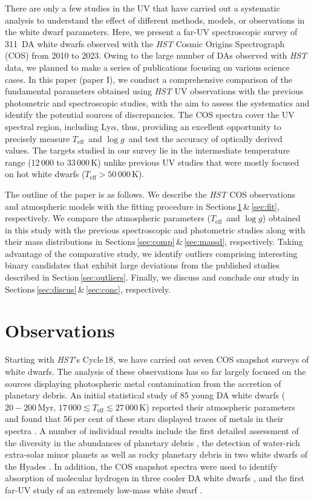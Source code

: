 \documentclass[fleqn,usenatbib, useAMS]{mnras}
\newcommand{\Teff}{\mbox{$T_{\mathrm{eff}}$}}
\newcommand{\logg}{\mbox{$\log g$}}
\newcommand{\totalnumber}{311}
\begin{document}
There are only a few studies in the UV \citep{Lajoie2007,Wall2023} that have carried out a systematic analysis to understand the effect of different methods, models, or observations in the white dwarf parameters. Here, we present a far-UV spectroscopic survey of \totalnumber\ DA white dwarfs observed with the \textit{HST} Cosmic Origins Spectrograph (COS) from 2010 to 2023. 
Owing to the large number of DAs observed with \textit{HST} data, we planned to make a series of publications focusing on various science cases. In this paper (paper I), we conduct a comprehensive comparison of the fundamental parameters obtained using \textit{HST} UV observations with the previous photometric and spectroscopic studies, with the aim to assess the systematics and identify the potential sources of discrepancies. The COS spectra cover the UV spectral region, including Ly$\alpha$, thus, providing an excellent opportunity to precisely measure \Teff\ and \logg\ and test the accuracy of optically derived values. The targets studied in our survey lie in the intermediate temperature range  (12\,000 to 33\,000\,K) unlike previous UV studies that were mostly focused on hot white dwarfs ($\Teff>50\,000$\,K).

The outline of the paper is as follows. We describe the \textit{HST} COS observations and atmospheric models with the fitting procedure in Sections\,\ref{sec:obs}\,\&\,\ref{sec:fit}, respectively. We compare the atmospheric parameters (\Teff\ and \logg) obtained in this study with the previous spectroscopic and photometric studies along with their mass distributions in Sections\,\ref{sec:comp}\,\&\,\ref{sec:massd}, respectively. Taking advantage of the comparative study, we identify outliers comprising interesting binary candidates that exhibit large deviations from the published studies described in Section\,\ref{sec:outliers}. Finally, we discuss and conclude our study in Sections\,\ref{sec:discus}\,\&\,\ref{sec:conc}, respectively.

\section{Observations}\label{sec:obs}
Starting with \textit{HST}'s Cycle\,18, we have carried out seven COS snapshot surveys of white dwarfs. The analysis of these observations has so far largely focused on the sources displaying photospheric metal contamination from the accretion of planetary debris. An initial statistical study of 85 young DA white dwarfs ($20-200$\,Myr, $17\,000\lesssim\Teff\lesssim27\,000$\,K) reported their atmospheric parameters and found that 56\,per cent of these stars displayed traces of metals in their spectra \citep{Koester2014}. A number of individual results include the first detailed assessment of the diversity in the abundances of planetary debris \citep{boris2012}, the detection of water-rich extra-solar minor planets \citep{farihi2013, hoskin2020} as well as rocky planetary debris in two white dwarfs of the Hyades \citep{farihi2013b}. In addition, the COS snapshot spectra were used to identify absorption of molecular hydrogen in three cooler DA white dwarfs \citep{Xu2013}, and the first far-UV study of an extremely low-mass white dwarf \citep{hermes2014}. 
\end{document}
